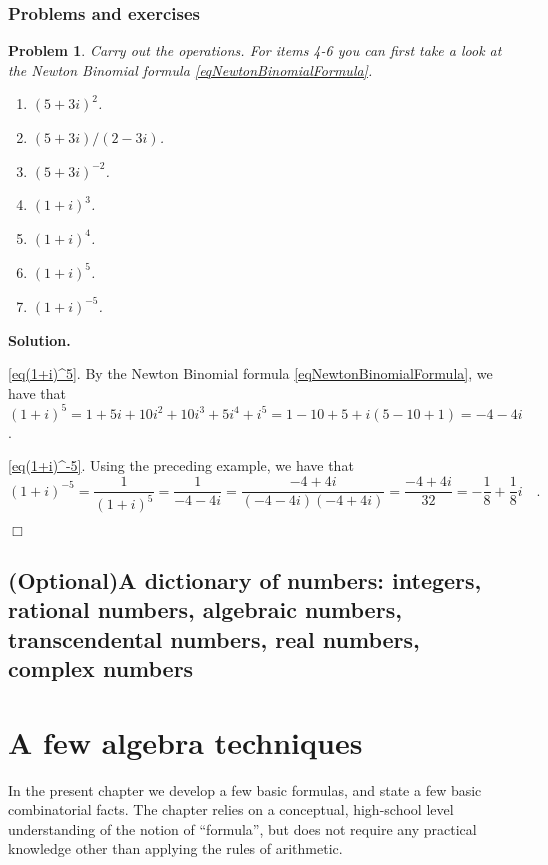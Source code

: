 \documentclass[12pt]{book}
\newenvironment{solution}{\medskip\noindent\textbf{Solution.} }{$\Box$}
\newtheorem{problem}[theorem]{Problem}
\newcommand{\optionalMaterial}{\textbf{(Optional)}}
\begin{document}
\subsection{Problems and exercises}
\begin{problem}\label{probComplexNumbersBasicOperations}
Carry out the operations. For items 4-6 you can first take a look at the Newton Binomial formula \eqref{eqNewtonBinomialFormula}.
\begin{multicols}{3}
\begin{enumerate}
\item $(5+3i)^2$.
\item $(5+3i)/(2-3i)$.
\item $(5+3i)^{-2}$.
\item $(1+i)^3$.
\item $(1+i)^4$.
\item \label{eq(1+i)^5} $(1+i)^5$.
\item \label{eq(1+i)^-5} $(1+i)^{-5}$.
\end{enumerate}
\end{multicols}
\end{problem}
\begin{solution}

\ref{eq(1+i)^5}.
By the Newton Binomial formula  \eqref{eqNewtonBinomialFormula}, we have that $(1+i)^5= 1 + 5i + 10 i^2+ 10i^3+5i^4+i^5= 1-10+5 +i(5-10+1)=-4-4i$.

\ref{eq(1+i)^-5}. Using the preceding example, we have that \[
(1+i)^{-5}=\frac{1}{(1+i)^5}=\frac{1}{ -4-4i}=\frac{-4+4i}{(-4-4i)(-4+4i)}=\frac{-4+4i}{32}=-\frac{1}{8}+\frac{1}{8}i\quad .
\]

\end{solution}
\section[\optionalMaterial A dictionary of numbers]{\optionalMaterial A dictionary of numbers: integers, rational numbers, algebraic numbers, transcendental numbers, real numbers, complex numbers}
\chapter{A few algebra techniques}
In the present chapter we develop a few basic formulas, and state a few basic combinatorial facts. The chapter relies on a conceptual, high-school level understanding of the notion of ``formula'', but does not require any practical knowledge other than applying the rules of arithmetic.
\end{document}
